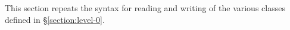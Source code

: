 \label{object-syntax-summary}
\begin{optDefinition}
\raggedbottom
%
This section repeats the syntax for reading and writing of the various classes
defined in \S\ref{section:level-0}.


\end{optDefinition}
